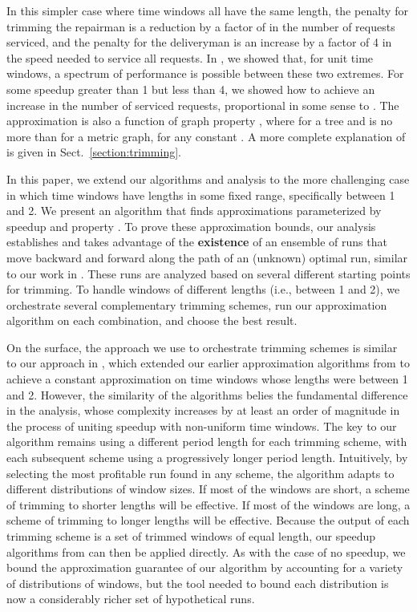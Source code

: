 \documentclass[11pt]{article}
\begin{document}
In this simpler case where time windows all have the same length, the penalty for trimming the repairman is a reduction by a factor of  in the number of requests serviced, 
and the penalty for the deliveryman is an increase by a factor of 4 in the speed needed to service all requests.
In \cite{Frederickson5}, we showed that, for unit time windows, a spectrum of performance is possible between these two extremes.
For some speedup  greater than 1 but less than 4, we showed how to achieve an increase in the number of serviced requests,
proportional in some sense to .  The approximation is also a function of graph property , where  for a tree and  is no more than  for a metric graph, for any constant .  A more complete explanation of  is given in Sect.~\ref{section:trimming}.

In this paper, we extend our algorithms and analysis to the more challenging case in which time windows have lengths in some fixed range, specifically between 1 and 2.
We present an algorithm that finds approximations parameterized by speedup  and property .
To prove these approximation bounds, our analysis establishes and takes advantage of the \textbf{existence} of an ensemble of runs that move backward and forward along the path of an (unknown) optimal run, similar to our work in \cite{Frederickson5}.  These runs are analyzed based on several different starting points for trimming.  To handle windows of different lengths (i.e., between 1 and 2),
we orchestrate several complementary trimming schemes, run our approximation algorithm on each combination,
and choose the best result.

On the surface, the approach we use to orchestrate trimming schemes is similar to our approach in \cite{Frederickson6}, which extended our earlier approximation algorithms from \cite{Frederickson3} to achieve a constant approximation on time windows whose lengths were between 1 and 2.  However, the similarity of the algorithms belies the fundamental difference in the analysis, whose complexity increases by at least an order of magnitude in the process of uniting speedup with non-uniform time windows.  The key to our algorithm remains using a different period length for each trimming scheme, with each subsequent scheme using a progressively longer period length.  Intuitively, by selecting the most profitable run found in any scheme, the algorithm adapts to different distributions of window sizes.  If most of the windows are short, a scheme of trimming to shorter lengths will be effective.  If most of the windows are long, a scheme of trimming to longer lengths will be effective.  Because the output of each trimming scheme is a set of trimmed windows of equal length, our speedup algorithms from \cite{Frederickson5} can then be applied directly.  As with the case of no speedup, we bound the approximation guarantee of our algorithm by  accounting for a variety of distributions of windows, but the tool needed to bound each distribution is now a considerably richer set of hypothetical runs.
\end{document}
